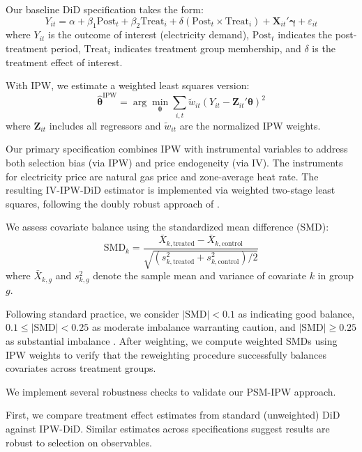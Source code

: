 \documentclass[sigconf,authordraft]{acmart}
\begin{document}
Our baseline DiD specification takes the form:
\begin{equation}
    Y_{it} = \alpha + \beta_1 \text{Post}_t + \beta_2 \text{Treat}_i + \delta (\text{Post}_t \times \text{Treat}_i) + \mathbf{X}_{it}'\boldsymbol{\gamma} + \varepsilon_{it}
\end{equation}
where $Y_{it}$ is the outcome of interest (electricity demand), $\text{Post}_t$ indicates the post-treatment period, $\text{Treat}_i$ indicates treatment group membership, and $\delta$ is the treatment effect of interest.

With IPW, we estimate a weighted least squares version:
\begin{equation}
    \hat{\boldsymbol{\theta}}^{\text{IPW}} = \arg\min_{\boldsymbol{\theta}} \sum_{i,t} \tilde{w}_{it} \left(Y_{it} - \mathbf{Z}_{it}'\boldsymbol{\theta}\right)^2
\end{equation}
where $\mathbf{Z}_{it}$ includes all regressors and $\tilde{w}_{it}$ are the normalized IPW weights.

Our primary specification combines IPW with instrumental variables to address both selection bias (via IPW) and price endogeneity (via IV). The instruments for electricity price are natural gas price and zone-average heat rate. The resulting IV-IPW-DiD estimator is implemented via weighted two-stage least squares, following the doubly robust approach of \citet{santanna2020doubly}.

We assess covariate balance using the standardized mean difference (SMD):
\begin{equation}
    \text{SMD}_k = \frac{\bar{X}_{k,\text{treated}} - \bar{X}_{k,\text{control}}}{\sqrt{(s^2_{k,\text{treated}} + s^2_{k,\text{control}})/2}}
\end{equation}
where $\bar{X}_{k,g}$ and $s^2_{k,g}$ denote the sample mean and variance of covariate $k$ in group $g$.

Following standard practice, we consider $|\text{SMD}| < 0.1$ as indicating good balance, $0.1 \leq |\text{SMD}| < 0.25$ as moderate imbalance warranting caution, and $|\text{SMD}| \geq 0.25$ as substantial imbalance \citep{austin2011introduction}. After weighting, we compute weighted SMDs using IPW weights to verify that the reweighting procedure successfully balances covariates across treatment groups.

We implement several robustness checks to validate our PSM-IPW approach.

First, we compare treatment effect estimates from standard (unweighted) DiD against IPW-DiD. Similar estimates across specifications suggest results are robust to selection on observables.
\end{document}
